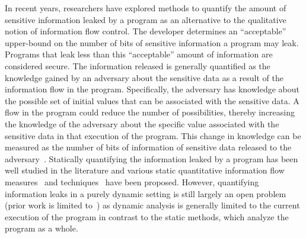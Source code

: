 In recent years, researchers have explored methods to quantify the
amount of  sensitive information leaked by a program as an alternative
to the qualitative notion of information flow control. The developer
determines an ``acceptable'' upper-bound on the number of bits of
sensitive information a program may leak. Programs that leak less than
this ``acceptable'' amount of information are considered secure. The
information released is generally quantified as the
knowledge gained by an adversary about the sensitive data as a result
of the information flow in the program. Specifically, the adversary
has knowledge about the possible set of initial values that can be
associated with the sensitive data. A flow in the program could reduce
the number of possibilities, thereby increasing the knowledge of the
adversary about the specific value associated with the sensitive data
in that execution of the program. This change in knowledge can be
measured as the number of bits of information of sensitive data
released to the adversary~\cite{CoverQIF}. Statically quantifying the
information leaked by a program has been well studied in the
literature and various static quantitative information flow
measures~\cite{shannon, guessing, smith2009, clarkson2009,
  csf12GLeakage} and techniques~\cite{denning82, clark, clarkson2009,
  smith2009, backes, kopf} have been proposed. However,
quantifying information leaks in a purely dynamic setting is still
largely an open problem (prior work is limited to~\cite{mccamant}) as
dynamic analysis is generally limited to the current execution of the
program in contrast to the static methods, which analyze the program
as a whole.  



